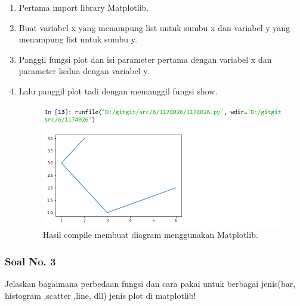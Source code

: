 \begin{enumerate}
	\item Pertama import library Matplotlib.	
	
	
	\item Buat variabel x yang menampung list untuk sumbu x dan variabel y yang menampung list untuk sumbu y.	
	
	
	\item Panggil fungsi plot dan isi parameter pertama dengan variabel x dan parameter kedua dengan variabel y.
		

	\item Lalu panggil plot tadi dengan memanggil fungsi show.
	
	

\begin{figure}[H]
	\includegraphics[width=12cm]{figures/6/1174026/2.png}
	\centering
	\caption{Hasil compile membuat diagram menggunakan Matplotlib.}
\end{figure}
\end{enumerate}
 
\subsubsection{Soal No. 3}
\hfill \break
Jelaskan bagaimana perbedaan fungsi dan cara pakai untuk berbagai jenis(bar, histogram ,scatter ,line, dll) jenis plot di matplotlib!

